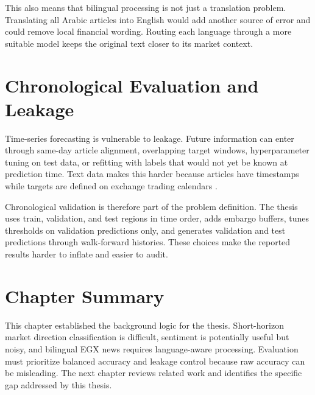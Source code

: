 This also means that bilingual processing is not just a translation problem. Translating all Arabic articles into English would add another source of error and could remove local financial wording. Routing each language through a more suitable model keeps the original text closer to its market context.

\section{Chronological Evaluation and Leakage}

Time-series forecasting is vulnerable to leakage. Future information can enter through same-day article alignment, overlapping target windows, hyperparameter tuning on test data, or refitting with labels that would not yet be known at prediction time. Text data makes this harder because articles have timestamps while targets are defined on exchange trading calendars \cite{liapis2023deep, dahal2023comparative}.

Chronological validation is therefore part of the problem definition. The thesis uses train, validation, and test regions in time order, adds embargo buffers, tunes thresholds on validation predictions only, and generates validation and test predictions through walk-forward histories. These choices make the reported results harder to inflate and easier to audit.

\section{Chapter Summary}

This chapter established the background logic for the thesis. Short-horizon market direction classification is difficult, sentiment is potentially useful but noisy, and bilingual EGX news requires language-aware processing. Evaluation must prioritize balanced accuracy and leakage control because raw accuracy can be misleading. The next chapter reviews related work and identifies the specific gap addressed by this thesis.
